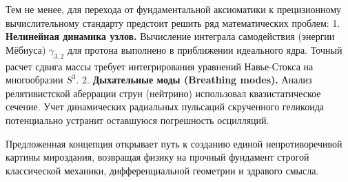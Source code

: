 \documentclass[11pt,a4paper]{article}
\begin{document}
	Тем не менее, для перехода от фундаментальной аксиоматики к прецизионному вычислительному стандарту предстоит решить ряд математических проблем:
	1. \textbf{Нелинейная динамика узлов.} Вычисление интеграла самодействия (энергии Мёбиуса) $\gamma_{3,2}$ для протона выполнено в приближении идеального ядра. Точный расчет сдвига массы требует интегрирования уравнений Навье-Стокса на многообразии $S^3$.
	2. \textbf{Дыхательные моды (Breathing modes).} Анализ релятивистской аберрации струн (нейтрино) использовал квазистатическое сечение. Учет динамических радиальных пульсаций скрученного геликоида потенциально устранит оставшуюся погрешность осцилляций.
	
	Предложенная концепция открывает путь к созданию единой непротиворечивой картины мироздания, возвращая физику на прочный фундамент строгой классической механики, дифференциальной геометрии и здравого смысла.
	
\end{document}
